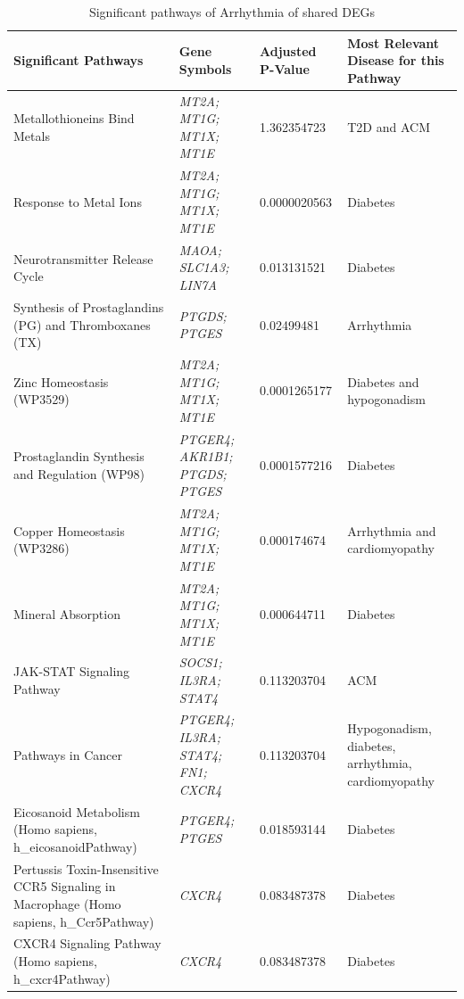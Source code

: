 \begin{longtable}{|p{4cm}|p{5cm}|p{2cm}|p{4cm}|}
    \caption[Significant pathways of Arrhythmia of shared DEGs]{Significant pathways of Arrhythmia of shared DEGs}
    \label{tab:Arrhythmia_pathways} \\
    \hline
    \textbf{Significant Pathways} & \textbf{Gene Symbols} & \textbf{Adjusted P-Value} & \textbf{Most Relevant Disease for this Pathway} \\
    \hline
      \renewcommand{\arraystretch}{1.2} %
    \small
    Metallothioneins Bind Metals & \textit{MT2A; MT1G; MT1X; MT1E} & 1.362354723 & T2D and ACM \\
    \hline
    Response to Metal Ions & \textit{MT2A; MT1G; MT1X; MT1E} & 0.0000020563 & Diabetes \\
    \hline
    Neurotransmitter Release Cycle & \textit{MAOA; SLC1A3; LIN7A} & 0.013131521 & Diabetes \\
    \hline
    Synthesis of Prostaglandins (PG) and Thromboxanes (TX) & \textit{PTGDS; PTGES} & 0.02499481 & Arrhythmia \\
    \hline
    Zinc Homeostasis (WP3529) & \textit{MT2A; MT1G; MT1X; MT1E} & 0.0001265177 & Diabetes and hypogonadism \\
    \hline
    Prostaglandin Synthesis and Regulation (WP98) & \textit{PTGER4; AKR1B1; PTGDS; PTGES} & 0.0001577216 & Diabetes \\
    \hline
    Copper Homeostasis (WP3286) & \textit{MT2A; MT1G; MT1X; MT1E} & 0.000174674 & Arrhythmia and cardiomyopathy \\
    \hline
    Mineral Absorption & \textit{MT2A; MT1G; MT1X; MT1E} & 0.000644711 & Diabetes \\
    \hline
    JAK-STAT Signaling Pathway & \textit{SOCS1; IL3RA; STAT4} & 0.113203704 & ACM \\
    \hline
    Pathways in Cancer & \textit{PTGER4; IL3RA; STAT4; FN1; CXCR4} & 0.113203704 & Hypogonadism, diabetes, arrhythmia, cardiomyopathy \\
    \hline
    Eicosanoid Metabolism (Homo sapiens, h\_eicosanoidPathway) & \textit{PTGER4; PTGES} & 0.018593144 & Diabetes \\
    \hline
    Pertussis Toxin-Insensitive CCR5 Signaling in Macrophage (Homo sapiens, h\_Ccr5Pathway) & \textit{CXCR4} & 0.083487378 & Diabetes \\
    \hline
    CXCR4 Signaling Pathway (Homo sapiens, h\_cxcr4Pathway) & \textit{CXCR4} & 0.083487378 & Diabetes \\
    \hline
\end{longtable}

